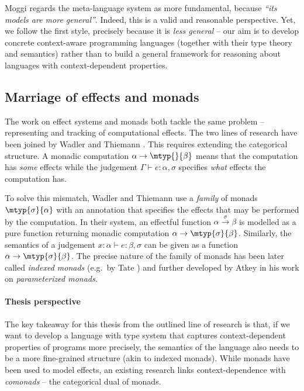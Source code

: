 Moggi regards the meta-language system as more fundamental, because \emph{``its models are more 
general''}. Indeed, this is a valid and reasonable perspective. Yet, we follow the first style,
precisely because it is \emph{less general} -- our aim is to develop concrete context-aware 
programming languages (together with their type theory and semantics) rather than to build a 
general framework for reasoning about languages with context-dependent properties.


\subsection{Marriage of effects and monads}
\label{sec:path-sem-effects}

The work on effect systems and monads both tackle the same problem -- representing and tracking of 
computational effects. The two lines of research have been joined by Wadler and Thiemann
\cite{monads-effects-marriage}. This requires extending the categorical structure. A monadic
computation $\alpha \rightarrow \mtyp{}{\beta}$ means that the computation has \emph{some} 
effects while the judgement $\Gamma \vdash e : \alpha, \sigma$ specifies \emph{what} effects
the computation has.

To solve this mismatch, Wadler and Thiemann use a \emph{family} of monads $\mtyp{\sigma}{\alpha}$
with an annotation that specifies the effects that may be performed by the computation. In their
system, an effectful function $\alpha \xrightarrow{\sigma} \beta$ is modelled as a pure 
function returning monadic computation $\alpha \rightarrow \mtyp{\sigma}{\beta}$. Similarly, the
semantics of a judgement $x:\alpha \vdash e : \beta, \sigma$ can be given as a function 
$\alpha \rightarrow \mtyp{\sigma}{\beta}$. 
The precise nature of the family of monads has been later called \emph{indexed monads} (e.g.~by Tate
\cite{effects-producer-semantics}) and further developed by Atkey \cite{monads-parameterised-notions} 
in his work on \emph{parameterized monads}.

\paragraph{Thesis perspective}
The key takeaway for this thesis from the outlined line of research is that, if we want to develop a 
language with type system that captures context-dependent properties of programs more precisely,
the semantics of the language also needs to be a more fine-grained structure (akin to indexed 
monads). While monads have been used to model effects, an existing research links context-dependence
with \emph{comonads} -- the categorical dual of monads.

